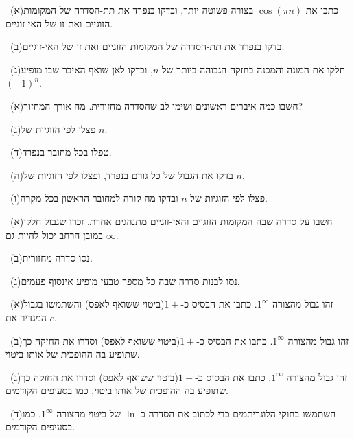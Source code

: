 \documentclass[12pt, a4paper]{article}
\begin{document}
\noindent {}\ (א)\enskip כתבו את $\cos(\pi n)$ בצורה פשוטה יותר, ובדקו בנפרד את תת-הסדרה של המקומות הזוגיים ואת זו של האי-זוגיים.\par\smallskip
\noindent {}\ (ב)\enskip בדקו בנפרד את תת-הסדרה של המקומות הזוגיים ואת זו של האי-זוגיים.\par\smallskip
\noindent {}\ (ג)\enskip חלקו את המונה והמכנה בחזקה הגבוהה ביותר של $n$, ובדקו לאן שואף האיבר שבו מופיע $(-1)^n$.\par\smallskip
\noindent {}\ (א)\enskip חשבו כמה איברים ראשונים ושימו לב שהסדרה מחזורית. מה אורך המחזור?\par\smallskip
\noindent {}\ (ג)\enskip פצלו לפי הזוגיות של $n$.\par\smallskip
\noindent {}\ (ד)\enskip טפלו בכל מחובר בנפרד.\par\smallskip
\noindent {}\ (ה)\enskip בדקו את הגבול של כל גורם בנפרד, ופצלו לפי הזוגיות של $n$.\par\smallskip
\noindent {}\ (ו)\enskip פצלו לפי הזוגיות של $n$ ובדקו מה קורה למחובר הראשון בכל מקרה.\par\smallskip
\noindent {}\ (א)\enskip חשבו על סדרה שבה המקומות הזוגיים והאי-זוגיים מתנהגים אחרת. זכרו שגבול חלקי במובן הרחב יכול להיות גם $\infty$.\par\smallskip
\noindent {}\ (ב)\enskip נסו סדרה מחזורית.\par\smallskip
\noindent {}\ (ג)\enskip נסו לבנות סדרה שבה כל מספר טבעי מופיע אינסוף פעמים.\par\smallskip
\noindent {}\ (א)\enskip זהו גבול מהצורה $1^\infty$. כתבו את הבסיס כ-$1+$(ביטוי ששואף לאפס) והשתמשו בגבול המגדיר את $e$.\par\smallskip
\noindent {}\ (ב)\enskip זהו גבול מהצורה $1^\infty$. כתבו את הבסיס כ-$1+$(ביטוי ששואף לאפס) וסדרו את החזקה כך שתופיע בה ההופכית של אותו ביטוי.\par\smallskip
\noindent {}\ (ג)\enskip זהו גבול מהצורה $1^\infty$. כתבו את הבסיס כ-$1+$(ביטוי ששואף לאפס) וסדרו את החזקה כך שתופיע בה ההופכית של אותו ביטוי, כמו בסעיפים הקודמים.\par\smallskip
\noindent {}\ (ד)\enskip השתמשו בחוקי הלוגריתמים כדי לכתוב את הסדרה כ-$\ln$ של ביטוי מהצורה $1^\infty$, כמו בסעיפים הקודמים.\par\smallskip
\end{document}
